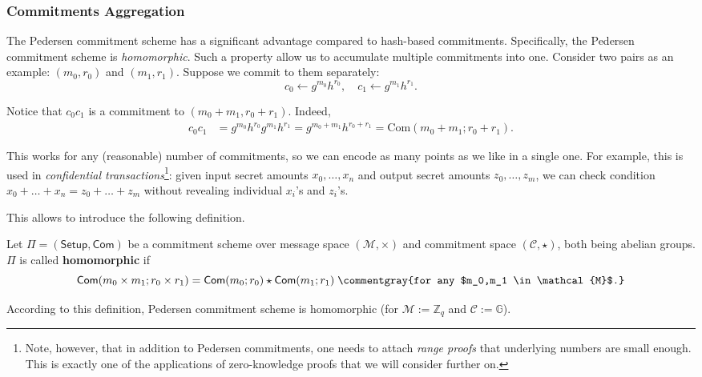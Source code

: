 \documentclass[../../book]{subfiles}
\begin{document}
\subsubsection{Commitments Aggregation}

The Pedersen commitment scheme has a significant advantage compared to hash-based commitments.
Specifically, the Pedersen commitment scheme is \textit{homomorphic}.
Such a property allow us to accumulate multiple commitments into one.
Consider two pairs as an example: $(m_0, r_0)$ and $(m_1, r_1)$.
Suppose we commit to them separately:
\begin{equation*}
    c_0 \gets g^{m_0}h^{r_0}, \quad c_1 \gets g^{m_1}h^{r_1}.
\end{equation*}

Notice that $c_0c_1$ is a commitment to $(m_0+m_1,r_0+r_1)$. Indeed,
\begin{align*}
    c_0c_1 &= g^{m_0}h^{r_0}g^{m_1}h^{r_1} = g^{m_0+m_1}h^{r_0+r_1} = \text{Com}(m_0+m_1;r_0+r_1).
\end{align*}

This works for any (reasonable) number of commitments, so we can encode as many points as we like in a single one.
For example, this is used in \emph{confidential transactions}\footnote{Note, however, that in addition to Pedersen commitments, one needs to attach \textit{range proofs} that underlying numbers are small enough. This is exactly one of the applications of zero-knowledge proofs that we will consider further on.}: given input secret amounts $x_0,\dots,x_n$ and output secret amounts $z_0,\dots,z_m$, we can check condition $x_0+\dots+x_n=z_0+\dots+z_m$ without revealing individual $x_i$'s and $z_i$'s.

This allows to introduce the following definition.

\begin{definition}
    Let $\Pi=(\mathsf{Setup},\mathsf{Com})$ be a commitment scheme over message space $(\mathcal{M},\times)$ and commitment space $(\mathcal{C},\star)$, both being abelian groups.
    $\Pi$ is called \textbf{homomorphic} if
    \begin{equation*}
        \mathsf{Com}(m_0 \times m_1; r_0 \times r_1) = \mathsf{Com}(m_0; r_0) \star \mathsf{Com}(m_1; r_1) \; \commentgray{for any $m_0,m_1 \in \mathcal{M}$.}
    \end{equation*}
\end{definition}

According to this definition, Pedersen commitment scheme is homomorphic (for $\mathcal{M}:=\mathbb{Z}_q$ and $\mathcal{C}:=\mathbb{G}$).
\end{document}
